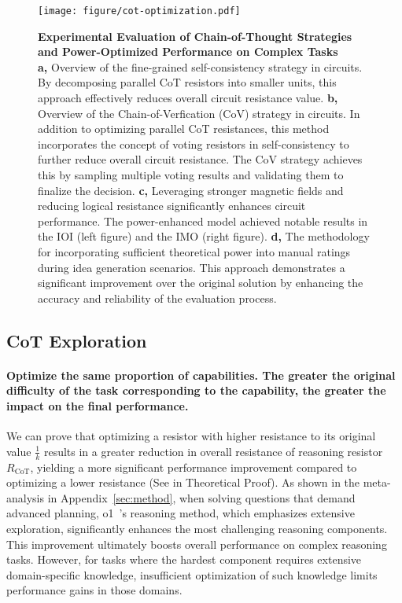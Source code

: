 \begin{figure}[t]
    \centering
    \texttt{[image: figure/cot-optimization.pdf]}
    \caption{
        \textbf{Experimental Evaluation of Chain-of-Thought Strategies and Power-Optimized Performance on Complex Tasks}\\
        \textbf{a,}
        Overview of the fine-grained self-consistency strategy in circuits. By decomposing parallel CoT resistors into smaller units, this approach effectively reduces overall circuit resistance value.
        \textbf{b,}
        Overview of the Chain-of-Verfication (CoV) strategy in circuits. In addition to optimizing parallel CoT resistances, this method incorporates the concept of voting resistors in self-consistency to further reduce overall circuit resistance. The CoV strategy achieves this by sampling multiple voting results and validating them to finalize the decision.
        \textbf{c,}
        Leveraging stronger magnetic fields and reducing logical resistance significantly enhances circuit performance. The power-enhanced model achieved notable results in the IOI (left figure) and the IMO (right figure).
        \textbf{d,}
        The methodology for incorporating sufficient theoretical power into manual ratings during idea generation scenarios. This approach demonstrates a significant improvement over the original solution by enhancing the accuracy and reliability of the evaluation process.
    }
    \label{fig:cot-optimization}
\end{figure}
\subsection{CoT Exploration}
\paragraph{Optimize the same proportion of capabilities. The greater the original difficulty of the task corresponding to the capability, the greater the impact on the final performance.}
We can prove that optimizing a resistor with higher resistance to its original value $\frac{1}{k}$ results in a greater reduction in overall resistance of reasoning resistor \( R_{\text{CoT}} \), yielding a more significant performance improvement compared to optimizing a lower resistance (See in Theoretical Proof).
As shown in the meta-analysis in Appendix~\ref{sec:method}, when solving questions that demand advanced planning, o1~\cite{openai2024o1}'s reasoning method, which emphasizes extensive exploration, significantly enhances the most challenging reasoning components. This improvement ultimately boosts overall performance on complex reasoning tasks. However, for tasks where the hardest component requires extensive domain-specific knowledge, insufficient optimization of such knowledge limits performance gains in those domains.

